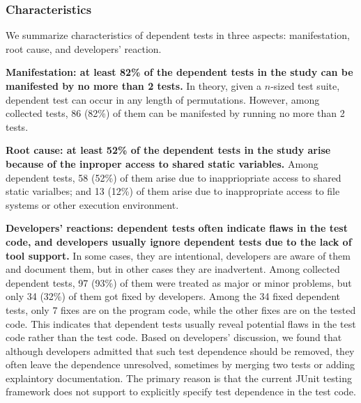\subsubsection{Characteristics}

We summarize characteristics of dependent tests in three
aspects: manifestation, root cause, and developers' reaction.

\vspace{1mm}
\noindent \textbf{{Manifestation: at least 82\% of the dependent
tests in the study can be manifested by no more than 2 tests.}} In theory,
given a $n$-sized test suite, dependent test can occur in any
length of permutations. However, among \dtnum collected tests,
86 (82\%) of them can be manifested by running no more than
2 tests. 

\vspace{1mm}
\noindent \textbf{{Root cause: at least 52\% of the dependent tests
in the study arise because of the inproper access to shared static
variables.}} Among \dtnum dependent tests, 58 (52\%) of them
arise due to inappriopriate access to
shared static varialbes; and 13 (12\%) of them arise
due to inappropriate access to file systems or other
execution environment. 

\vspace{1mm}
\noindent \textbf{{Developers' reactions: dependent tests
often indicate flaws in the test code, and developers usually
ignore dependent tests due to the lack of tool support.}}
In some cases, they are intentional, developers are aware
of them and document them, but in other cases they are
inadvertent. Among \dtnum collected dependent tests,
97 (93\%) of them were treated as major or minor problems,
but only 34 (32\%) of them got fixed by developers. Among
the 34 fixed dependent tests, only 7 fixes are
on the program code, while the other fixes are on the
tested code. This indicates that dependent tests usually
reveal potential flaws in the test code rather than the test code.
Based on developers' discussion, we found that although
developers admitted that such test dependence should be removed,
they often leave the dependence unresolved, sometimes by merging
two tests or adding explaintory documentation. The primary
reason is that the current JUnit testing framework does not
support to explicitly specify test dependence in the test code.





